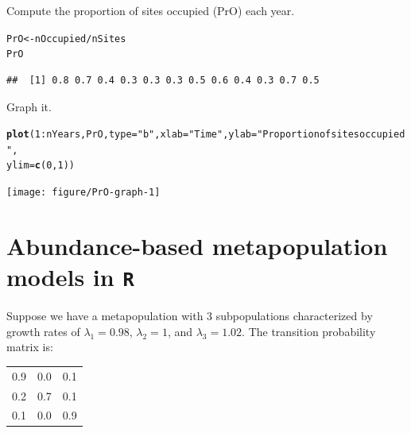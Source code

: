 \documentclass[12pt]{article}\usepackage[]{graphicx}\usepackage[]{color}
\makeatletter
\newcommand{\hlnum}[1]{\textcolor[rgb]{0.686,0.059,0.569}{#1}}%
\newcommand{\hlstr}[1]{\textcolor[rgb]{0.192,0.494,0.8}{#1}}%
\newcommand{\hlopt}[1]{\textcolor[rgb]{0,0,0}{#1}}%
\newcommand{\hlstd}[1]{\textcolor[rgb]{0.345,0.345,0.345}{#1}}%
\newcommand{\hlkwb}[1]{\textcolor[rgb]{0.69,0.353,0.396}{#1}}%
\newcommand{\hlkwc}[1]{\textcolor[rgb]{0.333,0.667,0.333}{#1}}%
\newcommand{\hlkwd}[1]{\textcolor[rgb]{0.737,0.353,0.396}{\textbf{#1}}}%
\newenvironment{kframe}{%
 \def\at@end@of@kframe{}%
 \ifinner\ifhmode%
  \def\at@end@of@kframe{\end{minipage}}%
  \begin{minipage}{\columnwidth}%
 \fi\fi%
 \def\FrameCommand##1{\hskip\@totalleftmargin \hskip-\fboxsep
 \colorbox{shadecolor}{##1}\hskip-\fboxsep
     \hskip-\linewidth \hskip-\@totalleftmargin \hskip\columnwidth}%
 \MakeFramed {\advance\hsize-\width
   \@totalleftmargin\z@ \linewidth\hsize
   \@setminipage}}%
 {\par\unskip\endMakeFramed%
 \at@end@of@kframe}
\newenvironment{knitrout}{}{} %
\makeatother
\begin{document}
\clearpage

Compute the proportion of sites occupied (PrO) each year.
\begin{knitrout}
\color{fgcolor}\begin{kframe}
\begin{alltt}
\hlstd{PrO} \hlkwb{<-} \hlstd{nOccupied} \hlopt{/} \hlstd{nSites}
\hlstd{PrO}
\end{alltt}
\begin{verbatim}
##  [1] 0.8 0.7 0.4 0.3 0.3 0.3 0.5 0.6 0.4 0.3 0.7 0.5
\end{verbatim}
\end{kframe}
\end{knitrout}

Graph it.
\begin{knitrout}
\color{fgcolor}\begin{kframe}
\begin{alltt}
\hlkwd{plot}\hlstd{(}\hlnum{1}\hlopt{:}\hlstd{nYears, PrO,} \hlkwc{type}\hlstd{=}\hlstr{"b"}\hlstd{,} \hlkwc{xlab}\hlstd{=}\hlstr{"Time"}\hlstd{,} \hlkwc{ylab}\hlstd{=}\hlstr{"Proportion of sites occupied"}\hlstd{,}
     \hlkwc{ylim}\hlstd{=}\hlkwd{c}\hlstd{(}\hlnum{0}\hlstd{,} \hlnum{1}\hlstd{))}
\end{alltt}
\end{kframe}
\texttt{[image: figure/PrO-graph-1]} 

\end{knitrout}


\clearpage

\section*{Abundance-based metapopulation models in \texttt{R}}

Suppose we have a metapopulation with 3 subpopulations characterized
by growth rates of $\lambda_1=0.98$, $\lambda_2=1$, and
$\lambda_3=1.02$. The transition probability matrix is:

\begin{table}[h!]
  \centering
  \begin{tabular}{ccc}
    \hline
    0.9 & 0.0 & 0.1 \\
    0.2 & 0.7 & 0.1 \\
    0.1 & 0.0 & 0.9 \\
    \hline
  \end{tabular}
\end{table}
\end{document}
